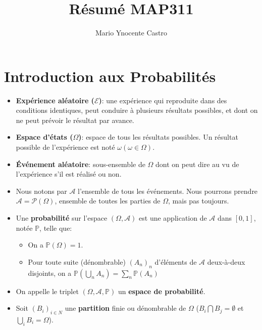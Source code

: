 \documentclass[10pt,a4paper,oneside]{article}
\begin{document}
\title{Résumé MAP311}
\author{Mario Ynocente Castro}

\maketitle

\section{Introduction aux Probabilités}

\begin{itemize}
\item
\textbf{Expérience aléatoire ($\mathcal{E}$)}: une expérience qui reproduite dans des conditions identiques, peut conduire à plusieurs résultats possibles, et dont on ne peut prévoir le résultat par avance.

\item
\textbf{Espace d'états ($\Omega$)}: espace de tous les résultats possibles. Un résultat possible de l'expérience est noté $\omega (\omega \in \Omega)$.

\item
\textbf{Événement aléatoire}: sous-ensemble de $\Omega$ dont on peut dire au vu de l'expérience s'il est réalisé ou non.

\item
Nous notons par $\mathcal{A}$ l'ensemble de tous les événements. Nous pourrons prendre $\mathcal{A} = \mathcal{P}(\Omega)$, ensemble de toutes les parties de $\Omega$, mais pas toujours.

\item
Une \textbf{probabilité} sur l'espace $(\Omega, \mathcal{A})$ est une application de $\mathcal{A}$ dans $[0,1]$, notée $\mathbb{P}$, telle que:

\begin{itemize}
\item
On a $\mathbb{P}(\Omega) = 1$.
\item
Pour toute suite (dénombrable) $(A_n)_n$ d'éléments de $\mathcal{A}$ deux-à-deux disjoints, on a $\mathbb{P}(\bigcup_{n}A_{n}) = \sum_n \mathbb{P}(A_n)$
\end{itemize}

\item
On appelle le triplet $(\Omega, \mathcal{A}, \mathbb{P})$ un \textbf{espace de probabilité}.

\item
Soit $(B_i)_{i \in N}$ une \textbf{partition} finie ou dénombrable de $\Omega$ ($B_i \bigcap B_j = \emptyset$ et $\bigcup_i B_i = \Omega$).


\end{itemize}
\end{document}
